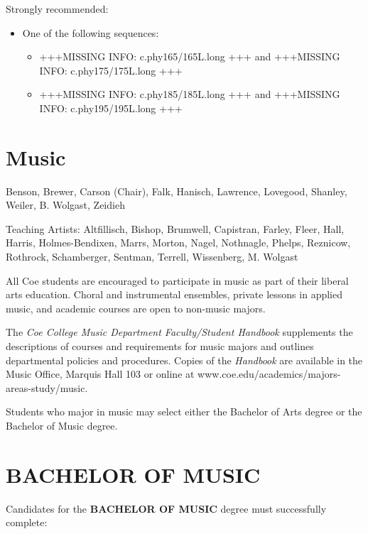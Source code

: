 \documentclass[
  letterpaper,
]{scrbook}
\providecommand{\tightlist}{%
  \setlength{\itemsep}{0pt}\setlength{\parskip}{0pt}}
\begin{document}
Strongly recommended:

\begin{itemize}
\tightlist
\item
  One of the following sequences:

  \begin{itemize}
  \tightlist
  \item
    +++MISSING INFO: c.phy165/165L.long +++ and +++MISSING INFO:
    c.phy175/175L.long +++
  \item
    +++MISSING INFO: c.phy185/185L.long +++ and +++MISSING INFO:
    c.phy195/195L.long +++
  \end{itemize}
\end{itemize}

\section{Music}\label{sec-music}

Benson, Brewer, Carson (Chair), Falk, Hanisch, Lawrence, Lovegood,
Shanley, Weiler, B. Wolgast, Zeidieh

Teaching Artists: Altfillisch, Bishop, Brumwell, Capistran, Farley,
Fleer, Hall, Harris, Holmes-Bendixen, Marrs, Morton, Nagel, Nothnagle,
Phelps, Reznicow, Rothrock, Schamberger, Sentman, Terrell, Wissenberg,
M. Wolgast

All Coe students are encouraged to participate in music as part of their
liberal arts education. Choral and instrumental ensembles, private
lessons in applied music, and academic courses are open to non-music
majors.

The \emph{Coe College Music Department Faculty/Student Handbook}
supplements the descriptions of courses and requirements for music
majors and outlines departmental policies and procedures. Copies of the
\emph{Handbook} are available in the Music Office, Marquis Hall 103 or
online at www.coe.edu/academics/majors-areas-study/music.

Students who major in music may select either the Bachelor of Arts
degree or the Bachelor of Music degree.

\section{BACHELOR OF MUSIC}\label{bachelor-of-music}

Candidates for the \textbf{BACHELOR OF MUSIC} degree must successfully
complete:
\end{document}
